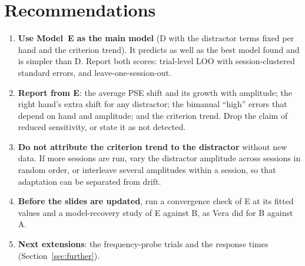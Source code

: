 \section{Recommendations}\label{sec:recs}

\begin{enumerate}[leftmargin=1.6em]
\item \textbf{Use Model~E as the main model} (D with the distractor terms fixed per hand and the criterion trend). It predicts as well as the best model found and is simpler than D. Report both scores: trial-level LOO with session-clustered standard errors, and leave-one-session-out.
\item \textbf{Report from E}: the average PSE shift and its growth with amplitude; the right hand's extra shift for any distractor; the bimanual ``high'' errors that depend on hand and amplitude; and the criterion trend. Drop the claim of reduced sensitivity, or state it as not detected.
\item \textbf{Do not attribute the criterion trend to the distractor} without new data. If more sessions are run, vary the distractor amplitude across sessions in random order, or interleave several amplitudes within a session, so that adaptation can be separated from drift.
\item \textbf{Before the slides are updated}, run a convergence check of E at its fitted values and a model-recovery study of E against B, as Vera did for B against A.
\item \textbf{Next extensions}: the frequency-probe trials and the response times (Section~\ref{sec:further}).
\end{enumerate}
